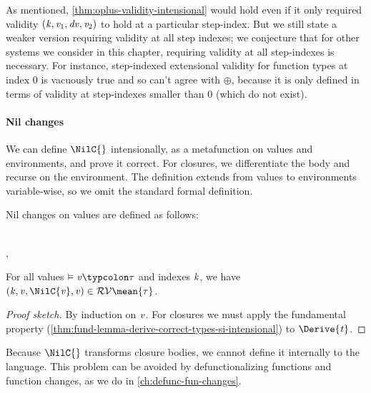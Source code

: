 As mentioned, \cref{thm:oplus-validity-intensional} would hold even if it only
required validity \ensuremath{(\Varid{k},\Varid{v}_{1},\Varid{dv},\Varid{v}_{2})} to hold at a particular step-index. But we
still state a weaker version requiring validity at all step indexes; we
conjecture that for other systems we consider in this chapter, requiring
validity at all step-indexes is necessary. For instance, step-indexed
extensional validity for function types at index $0$ is vacuously true and so
can't agree with \ensuremath{\oplus }, because it is only defined in terms of validity at
step-indexes smaller than 0 (which do not exist).

\paragraph{Nil changes} We can define \ensuremath{\NilC{}} intensionally, as a metafunction on values and
environments, and prove it correct.
For closures, we differentiate the body and recurse on the environment. The
definition extends from values to environments variable-wise, so we omit the
standard formal definition.
\begin{definition}
  \label{def:nil-change-operational}
  Nil changes on values are defined as follows:
\begin{hscode}\SaveRestoreHook
{}%
%
%
\>[3]{}\mathrel{=}\rho\mathrel{\filleddiamond}\NilC{\rho}\<[E]%
\\
\>[3]{}\mathrel{=}\langle{},\rangle{}\<[E]%
\\
\>[3]{}\mathrel{=}\<[E]%
\ColumnHook
\end{hscode}\resethooks
\end{definition}
\begin{lemma}
  For all values \ensuremath{\vDash\Varid{v}\typcolon\tau} and indexes \ensuremath{\Varid{k}}, we have \ensuremath{(\Varid{k},\Varid{v},\NilC{\Varid{v}},\Varid{v})\in \mathcal{RV}\mean{\tau}}.
\end{lemma}
\begin{proof}[Proof sketch]
  By induction on \ensuremath{\Varid{v}}. For closures we must apply the fundamental
  property
  (\cref{thm:fund-lemma-derive-correct-types-si-intensional}) to
  \ensuremath{\Derive{\Varid{t}}}.
\end{proof}
Because \ensuremath{\NilC{}} transforms closure bodies, we cannot define it internally to the
language. This problem can be avoided by defunctionalizing functions and
function changes, as we do in \cref{ch:defunc-fun-changes}.

